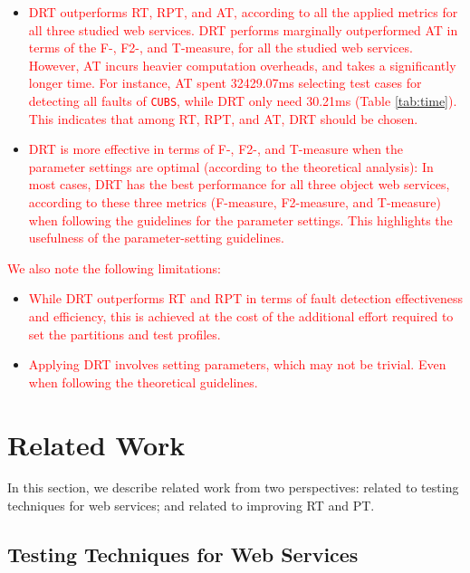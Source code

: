 \documentclass[10pt,journal,compsoc]{IEEEtran}
\begin{document}
\begin{itemize}
  \item
  \textcolor{red}{DRT outperforms RT, RPT, and AT, according to all the applied metrics for all three studied web services. DRT performs marginally outperformed AT in terms of the F-, F2-, and T-measure, for all the studied web services. However, AT incurs heavier computation overheads, and takes a significantly longer time. For instance, AT spent 32429.07ms selecting test cases for detecting all faults of \texttt{CUBS}, while DRT only need 30.21ms (Table \ref{tab:time}). This indicates that among RT, RPT, and AT, DRT should be chosen.}

  \item
  \textcolor{red}{DRT is more effective in terms of F-, F2-, and T-measure when the parameter settings are optimal (according to the theoretical analysis): In most cases, DRT has the best performance for all three object web services, according to these three metrics (F-measure, F2-measure, and T-measure) when following the guidelines for the parameter settings. This highlights the usefulness of the parameter-setting guidelines.}
\end{itemize}

\textcolor{red}{We also note the following limitations:}

\begin{itemize}
  \item
  \textcolor{red}{While DRT outperforms RT and RPT in terms of fault detection effectiveness and efficiency, this is achieved at the cost of the additional effort required to set the partitions and test profiles.}

  \item
  \textcolor{red}{Applying DRT involves setting parameters, which may not be trivial. Even when following the theoretical guidelines.}
\end{itemize}


\section{Related Work}
\label{sec:relatedwork}

In this section, we describe related work from two perspectives:
related to testing techniques for web services; and
related to improving RT and PT.

\subsection{Testing Techniques for Web Services}
\label{sec:relatedworkWS}
\end{document}
